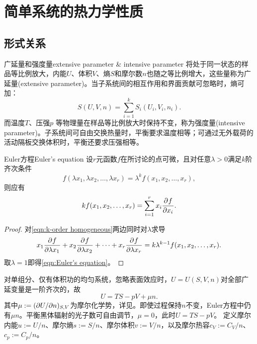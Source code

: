 \chapter{简单系统的热力学性质}
\label{chap:simple system}

\section{形式关系}

\begin{definition}
	{广延量和强度量}{extensive parameter & intensive parameter}
	将处于同一状态的样品等比例放大，内能$U$、体积$V$、熵$S$和摩尔数$n$也随之等比例增大，这些量称为广延量(extensive parameter)。当子系统间的相互作用和界面贡献可忽略时，熵可加：
	\begin{equation}
		S(U,V,n) = \sum_{i=1}^kS_i(U_i,V_i,n_i).
	\end{equation}
	而温度$T$、压强$p$%
	等物理量在样品等比例放大时保持不变，称为强度量(intensive parameter)。子系统间可自由交换热量时，平衡要求温度相等；可通过无外载荷的活动隔板交换体积时，平衡还要求压强相等。
\end{definition}

\begin{theorem}
	{Euler方程}{Euler's equation}
	设$r$元函数$f$在所讨论的点可微，且对任意$\lambda > 0$满足$k$阶齐次条件
	\begin{equation}
		\label{eqn:k-order homogeneous}
		f(\lambda x_1,\lambda x_2,\ldots,\lambda x_r) = \lambda^k f(x_1,x_2,\ldots,x_r),
	\end{equation}
	则应有
	\begin{equation}
		\label{eqn:Euler's equation}
		k f(x_1,x_2,\ldots,x_r) = \sum_{i=1}^r x_i\frac{\partial^{}f}{\partial{x_i}^{}}.
	\end{equation}
\end{theorem}

\begin{proof}
	对\eqref{eqn:k-order homogeneous}两边同时对$\lambda$求导
	\[
		x_1\frac{\partial^{}f}{\partial{\lambda x_1}^{}} + x_2\frac{\partial^{}f}{\partial{\lambda x_2}^{}} + \cdots + x_r\frac{\partial^{}f}{\partial{\lambda x_r}^{}} = k\lambda^{k-1}f(x_1,x_2,\ldots,x_r).
	\]
	取$\lambda = 1$即得\eqref{eqn:Euler's equation}。
\end{proof}

\begin{corollary}
	对单组分、仅有体积功的均匀系统，忽略表面效应时，$U = U(S,V,n)$对全部广延变量是一阶齐次的，故
	\begin{equation}
		\label{eqn:U=TS-pV}
		U = TS - pV + \mu n.
	\end{equation}
	其中$\mu := (\partial U/\partial n)_{S,V}$为摩尔化学势，详见。即使过程保持$n$不变，Euler方程中仍有$\mu n$。平衡黑体辐射的光子数可自由调节，$\mu = 0$，此时$U = TS - pV$。
	定义摩尔内能$u := U/n$、摩尔熵$s := S/n$、摩尔体积$v := V/n$，以及摩尔热容$c_V := C_V/n$、$c_p := C_p/n$。
\end{corollary}

